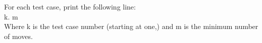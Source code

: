 For each test case, print the following line:
\\k. m
\\Where k is the test case number (starting at one,) and m is the minimum number of moves.

\